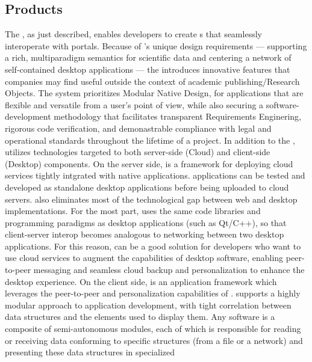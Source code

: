 \documentclass[10pt,letterpaper]{article}
\begin{document}
\subsection{{\lMOSAIC} Products}
The {\MOSAIC} {\SDK}, as just described, enables 
developers to create {\RO}s that 
seamlessly interoperate with {\MOSAIC} 
portals.  Because of {\MOSAIC}'s unique design 
requirements --- supporting a 
rich, multiparadigm semantics for scientific data 
and centering a network of self-contained 
desktop applications --- the {\MOSAIC} {\SDK} 
introduces innovative features that companies may 
find useful outside the context of academic 
publishing/Research Objects.  
The {\MOSAIC} system  
prioritizes Modular Native Design, for applications 
that are flexible and versatile 
from a user's point of view, 
while also securing a software-development methodology 
that facilitates transparent Requirements 
Enginering, rigorous code verification, 
and demonastrable compliance with 
legal and operational standards throughout the 
lifetime of a project.
\p{}
In addition to the {\SDK}, {\MOSAIC} utilizes technologies 
targeted to both server-side (Cloud) 
and client-side (Desktop) components.  On the 
server side, {\NDPCloud} is a framework for deploying 
cloud services tightly intgrated with native applications.  
{\NDPCloud} applications can be tested and 
developed as standalone desktop applications before 
being uploaded to cloud servers.  
{\NDPCloud} also eliminates most of the technological 
gap between web and desktop implementations.  
For the most part, {\NDPCloud} uses the same code libraries 
and programming paradigms as 
desktop applications (such as Qt/C++), 
so that client-server interop 
becomes analogous to networking between two 
desktop applications.  For this reason, {\NDPCloud} 
can be a good solution for developers who want to 
use cloud services to augment the capabilities 
of desktop software, enabling peer-to-peer 
messaging and seamless cloud backup and 
personalization to enhance the desktop experience.
\p{}
On the client side, {\VersatileUX} is an {\GUI} 
application framework which leverages 
the peer-to-peer and personalization 
capabilities of {\NDPCloud}.  {\VersatileUX} 
supports a highly modular approach to 
application development, with tight 
correlation between data structures and the {\GUI} 
elements used to display them.  Any {\VersatileUX} 
software is a composite of semi-autonomous  
modules, each of which is responsible for 
reading or receiving data conforming 
to specific structures (from a file or a network) 
and presenting these data structures in specialized 
\end{document}
